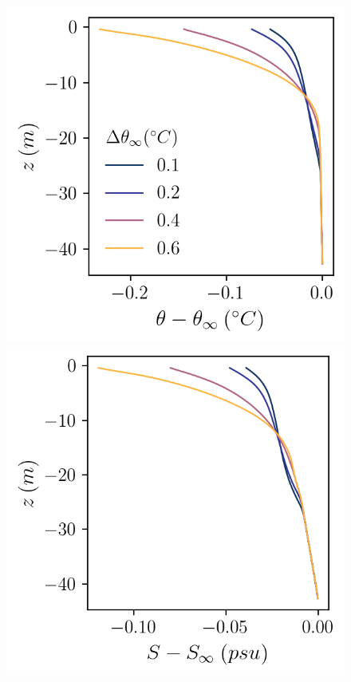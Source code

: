 \documentclass[draft]{agujournal2019}
\begin{document}
\begin{figure}[h!]
    \centering
    \begin{minipage}{0.33\textwidth}
        \includegraphics[trim={0 4cm 0 0},clip, width=\textwidth]{Figures/pt_cmp_dT_43h_tav13h_z_profile.png}
    \end{minipage}%
    \begin{minipage}{0.33\textwidth}
        \includegraphics[trim={0 4cm 0 0},clip, width=\textwidth]{Figures/sa_cmp_dT_43h_tav13h_z_profile.png}

\end{minipage}
\end{figure}
\end{document}
